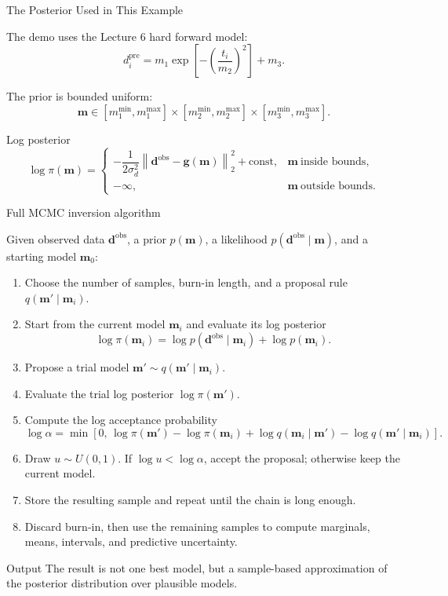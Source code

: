 \documentclass[aspectratio=169]{beamer}
\renewcommand{\vec}[1]{\mathbf{#1}}
\newcommand{\dobs}{{\vec{d}^{\text{obs}}}}
\newcommand{\mm}{ {\vec{m}} }
\renewcommand{\gg}[1]{\vec{g}\left(#1\right)}
\begin{document}
\begin{frame}{The Posterior Used in This Example}
\small

The demo uses the Lecture 6 hard forward model:
\[
d_i^{\mathrm{pre}}
=
m_1\exp\left[-\left(\frac{t_i}{m_2}\right)^2\right]+m_3.
\]

The prior is bounded uniform:
\[
\mm\in[m^{\min}_1,m^{\max}_1]\times[m^{\min}_2,m^{\max}_2]\times[m^{\min}_3,m^{\max}_3].
\]

\begin{alertblock}{Log posterior}
\[
\log\pi(\mm)
=
\begin{cases}
-\dfrac{1}{2\sigma_d^2}
\left\|\dobs-\gg{\mm}\right\|_2^2 + \text{const},
& \mm\ \text{inside bounds},\\[0.25cm]
-\infty,
& \mm\ \text{outside bounds}.
\end{cases}
\]
\end{alertblock}
\end{frame}

\begin{frame}{Full MCMC inversion algorithm}
\footnotesize

Given observed data $\dobs$, a prior $p(\mm)$, a likelihood $p(\dobs\mid\mm)$, and a starting model $\mm_0$:

\begin{enumerate}
    \item[--] Choose the number of samples, burn-in length, and a proposal rule $q(\mm'\mid\mm_i)$.
    \item[--] Start from the current model $\mm_i$ and evaluate its log posterior
    \[
    \log\pi(\mm_i)=\log p(\dobs\mid\mm_i)+\log p(\mm_i).
    \]
    \item[--] Propose a trial model $\mm'\sim q(\mm'\mid\mm_i)$.
    \item[--] Evaluate the trial log posterior $\log\pi(\mm')$.
    \item[--] Compute the log acceptance probability
    \[
    \log\alpha=
    \min\left[0,\,\log\pi(\mm')-\log\pi(\mm_i)+\log q(\mm_i\mid\mm')-\log q(\mm'\mid\mm_i)\right].
    \]
    \item[--] Draw $u\sim U(0,1)$. If $\log u<\log\alpha$, accept the proposal; otherwise keep the current model.
    \item[--] Store the resulting sample and repeat until the chain is long enough.
    \item[--] Discard burn-in, then use the remaining samples to compute marginals, means, intervals, and predictive uncertainty.
\end{enumerate}

\begin{alertblock}{Output}
The result is not one best model, but a sample-based approximation of the posterior distribution over plausible models.
\end{alertblock}
\end{frame}
\end{document}
